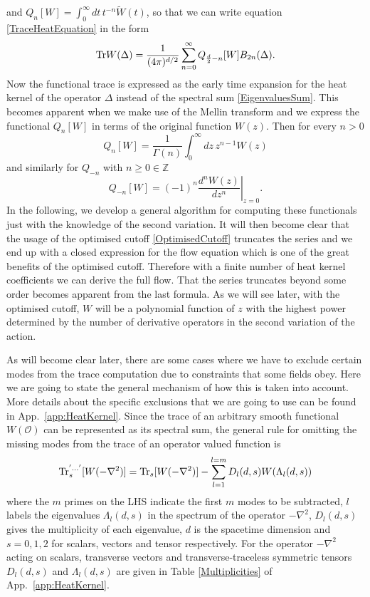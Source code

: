 \documentclass[notitlepage,eqsecnum,bm,amsmath,preprintnumbers,superscriptaddress,nofootinbib,aps,11pt]{revtex4-1}
\begin{document}
and $Q_n[W]=\int_0^{\infty}dt\,t^{-n}\tilde W(t)$, so that we can write equation \eqref{TraceHeatEquation} in the form
\begin{equation}
\textnormal{Tr}W(\Delta)=\frac{1}{(4\pi)^{d/2}}\sum_{n=0}^{\infty}Q_{\frac{d}{2}-n}[W]B_{2n}(\Delta).\label{GeneralQ&B}
\end{equation}
Now the functional trace is expressed as the early time expansion for the heat kernel of the operator $\Delta$ instead 
of the spectral sum \eqref{EigenvaluesSum}. This becomes apparent when we make use of the Mellin transform and we express the functional $Q_n[W]$ in terms of the original function $W(z)$. Then for every $n>0$ 
\begin{equation}
Q_n[W]=\frac{1}{\Gamma(n)}\int_0^{\infty}dz\,z^{n-1}W(z) \label{PositiveQDefinition}
\end{equation}
and similarly for $Q_{-n}$ with $n\geq0\in\mathbb{Z}$
\begin{equation}
Q_{-n}[W]=(-1)^n\left.\frac{d^nW(z)}{dz^n}\right|_{z=0}. \label{NegativeQDefinition}
\end{equation}
In the following, we develop a general algorithm for computing these functionals just with the knowledge of the second variation. 
It will then become clear that the usage of the optimised cutoff  \eqref{OptimisedCutoff} truncates the series and we end up with a closed expression for the flow equation which
is one of the great benefits of the optimised 
cutoff.  Therefore with a finite number 
of heat kernel coefficients we can derive the full flow. That the series truncates beyond some order becomes apparent from
the last formula. As we will see later, with the optimised cutoff, $W$ will be a polynomial function of $z$ with the highest power
determined by the number of derivative operators in the second variation of the action.

As will become clear later, there are some cases where we have to exclude certain modes from the trace computation due to constraints 
that some fields obey. Here we are going to state the general mechanism of how this is taken into account. More details about the 
specific exclusions that we are going to use can be found in App.~\ref{app:HeatKernel}. Since the trace of an arbitrary smooth functional $W(\mathcal{O})$ can be represented as its spectral sum, the general rule for omitting the missing modes from the trace of an operator valued function is
\begin{equation}\label{modeexclusion}
\textnormal{Tr}_s^{'...'}[W(-\nabla^2)]=\textnormal{Tr}_s[W(-\nabla^2)]-\sum_{l=1}^{l=m}D_l(d,s)W(\Lambda_l(d,s))
\end{equation} 
where the $m$ primes on the LHS indicate the first $m$ modes to be subtracted, $l$ labels the eigenvalues $\Lambda_l(d,s)$ 
in the spectrum of the operator $-\nabla^2$,  $D_l(d,s)$ gives the multiplicity of each eigenvalue, $d$ is the spacetime dimension and 
$s=0,1,2$ for scalars, vectors and tensor respectively. 
For the operator $-\nabla^2$ acting on scalars, transverse vectors and transverse-traceless symmetric tensors 
$D_l(d,s)$ and $\Lambda_l(d,s)$ are given in Table \ref{Multiplicities} of App.~\ref{app:HeatKernel}. 
\end{document}
